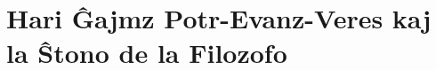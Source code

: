 \part{Hari Ĝajmz Potr-Evanz-Veres kaj la Ŝtono de la Filozofo}
% 
% 
% 
% 
% 
% 
% 
% 
% 
% 
% 
% 
% 
% 
% 
% 
% 
% 
% 
% 
% 
% 
% 


